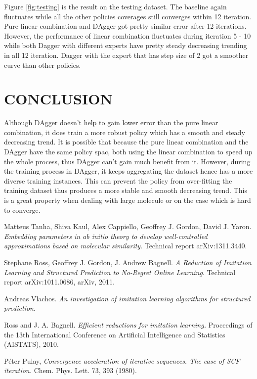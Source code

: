 \documentclass[twoside]{article}
\begin{document}
Figure \ref{fig:testing} is the result  on the testing dataset.
The baseline again fluctuates while all the other policies coverages still converges within 12 iteration. 
Pure linear combination and DAgger got pretty similar error after 12 iterations. However, the performance of linear combination fluctuates during iteration 5 - 10 while both Dagger with different experts have pretty steady decreasing trending in all 12 iteration. Dagger with the expert that has step size of 2 got a smoother curve than other policies.


%
%
%


\section{CONCLUSION}

Although DAgger doesn't help to gain lower error than the pure linear combination, it does train a more robust policy which has a smooth and steady decreasing trend. It is possible that because the pure linear combination and the DAgger have the same policy spac, both using the linear combination to speed up the whole process, thus DAgger can't gain much benefit from it. However, during the training process in DAgger, it keeps aggregating the dataset hence has a more diverse training instances. This can prevent the policy from over-fitting the training dataset thus produces a more stable and smooth decreasing trend. This is a great property when dealing with large molecule or on the case which is hard to converge.


\begin{thebibliography}{9}
  Matteus Tanha, Shiva Kaul, Alex Cappiello, Geoffrey J. Gordon, David J. Yaron.
  \emph{Embedding parameters in ab initio theory to develop well-controlled approximations based on molecular similarity}.
  Technical report arXiv:1311.3440.
  
  Stephane Ross, Geoffrey J. Gordon, J. Andrew Bagnell.
  \emph{A Reduction of Imitation Learning and Structured Prediction to No-Regret Online Learning}.
  Technical report arXiv:1011.0686, arXiv, 2011.
  
  Andreas Vlachos.
  \emph{An investigation of imitation learning algorithms for structured prediction}.
  
    Ross and J. A. Bagnell.
  \emph{Efficient reductions for imitation
learning.} Proceedings of the 13th International
Conference on Artificial Intelligence and Statistics (AISTATS),
2010.

   P\'{e}ter Pulay,
  \emph{Convergence acceleration of iterative sequences. The case of SCF iteration.} Chem. Phys. Lett. 73, 393 (1980).

\end{thebibliography}
\end{document}
